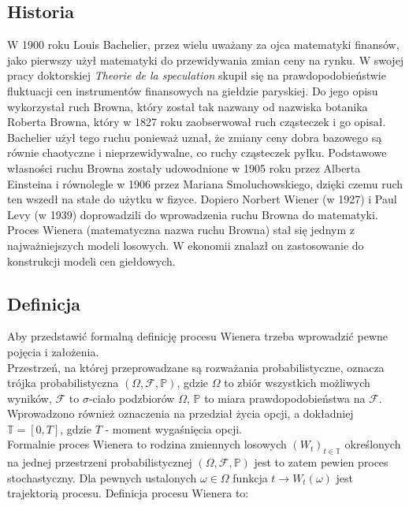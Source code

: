 \documentclass[]{pwr_wmat_praca_dyplomowa}
\theoremstyle{plain}
\numberwithin{theorem}{chapter}
\theoremstyle{definition}
\numberwithin{theorem}{chapter}
\begin{document}
\subsection{Historia}

W 1900 roku Louis Bachelier, przez wielu uważany za ojca matematyki finansów, jako pierwszy użył matematyki do przewidywania zmian ceny na rynku. W swojej pracy doktorskiej \textit{Theorie de la speculation} skupił się na prawdopodobieństwie fluktuacji cen instrumentów finansowych na giełdzie paryskiej. Do jego opisu wykorzystał ruch Browna, który został tak nazwany od nazwiska botanika Roberta Browna, który w 1827 roku zaobserwował ruch cząsteczek i go opisał. Bachelier użył tego ruchu ponieważ uznał, że zmiany ceny dobra bazowego są równie chaotyczne i nieprzewidywalne, co ruchy cząsteczek pyłku. Podstawowe własności ruchu Browna zostały udowodnione w 1905 roku przez Alberta Einsteina i równolegle w 1906 przez Mariana Smoluchowskiego, dzięki czemu ruch ten wszedł na stałe do użytku w fizyce. Dopiero Norbert Wiener (w 1927) i Paul Levy (w 1939) doprowadzili do wprowadzenia ruchu Browna do matematyki. Proces Wienera (matematyczna nazwa ruchu Browna) stał się jednym z najważniejszych modeli losowych. W ekonomii znalazł on zastosowanie do konstrukcji modeli cen giełdowych.\\

\subsection{Definicja}
Aby przedstawić formalną definicję procesu Wienera trzeba wprowadzić pewne pojęcia i założenia. \\

Przestrzeń, na której przeprowadzane są rozważania probabilistyczne, oznacza trójka probabilistyczna $(\Omega, \mathcal{F}, \mathbb{P})$, gdzie $\Omega$ to zbiór wszystkich możliwych wyników, $\mathcal{F}$ to $\sigma$-ciało podzbiorów $\Omega$, $\mathbb{P}$ to miara prawdopodobieństwa na $\mathcal{F}$. Wprowadzono również oznaczenia na przedział życia opcji, a dokładniej $\mathbb{T} = [0,T]$, gdzie $T$ - moment wygaśnięcia opcji.\\
\newline
Formalnie proces Wienera to rodzina zmiennych losowych $(W_t)_{t\in \mathbb{T}}$  określonych na jednej przestrzeni probabilistycznej $(\Omega, \mathcal{F}, \mathbb{P})$ jest to zatem pewien proces stochastyczny. Dla pewnych ustalonych $\omega \in \Omega$ funkcja $t \rightarrow W_t(\omega)$ jest trajektorią procesu. Definicja procesu Wienera to:
\end{document}
